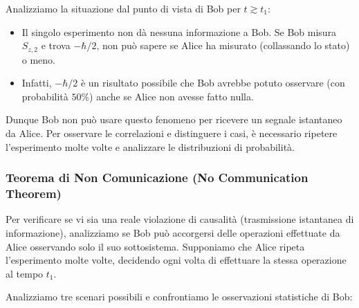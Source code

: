 Analizziamo la situazione dal punto di vista di Bob per $t \gtrsim t_1$:
\begin{itemize}
    \item Il singolo esperimento non dà nessuna informazione a Bob. Se Bob misura $S_{z,2}$ e trova $-\hbar/2$, non può sapere se Alice ha misurato (collassando lo stato) o meno.
    \item Infatti, $-\hbar/2$ è un risultato possibile che Bob avrebbe potuto osservare (con probabilità $50\%$) anche se Alice non avesse fatto nulla.
\end{itemize}
Dunque Bob non può usare questo fenomeno per ricevere un segnale istantaneo da Alice. Per osservare le correlazioni e distinguere i casi, è necessario ripetere l'esperimento molte volte e analizzare le distribuzioni di probabilità.


\subsubsection{Teorema di Non Comunicazione (No Communication Theorem)}

Per verificare se vi sia una reale violazione di causalità (trasmissione istantanea di informazione), analizziamo se Bob può accorgersi delle operazioni effettuate da Alice osservando solo il suo sottosistema.
Supponiamo che Alice ripeta l'esperimento molte volte, decidendo ogni volta di effettuare la stessa operazione al tempo $t_1$.

Analizziamo tre scenari possibili e confrontiamo le osservazioni statistiche di Bob:

